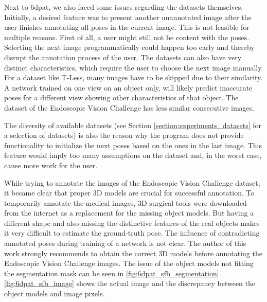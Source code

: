 Next to \ac{6dpat}, we also faced some issues regarding the datasets themselves. Initially, a desired feature was to present another unannotated image after the user finishes annotating all poses in the current image. This is not feasible for multiple reasons. First of all, a user might still not be content with the poses. Selecting the next image programmatically could happen too early and thereby disrupt the annotation process of the user. The datasets can also have very distinct characteristics, which require the user to choose the next image manually. For a dataset like T-Less, many images have to be skipped due to their similarity. A network trained on one view on an object only, will likely predict inaccurate poses for a different view showing other characteristics of that object. The dataset of the Endoscopic Vision Challenge has less similar consecutive images.

The diversity of available datasets (see Section \ref{section:experiments_datasets} for a selection of datasets) is also the reason why the program does not provide functionality to initialize the next poses based on the ones in the last image. This feature would imply too many assumptions on the dataset and, in the worst case, cause more work for the user. 

While trying to annotate the images of the Endoscopic Vision Challenge dataset, it became clear that proper 3D models are crucial for successful annotation. To temporarily annotate the medical images, 3D surgical tools were downloaded from the internet as a replacement for the missing object models. But having a different shape and also missing the distinctive features of the real objects makes it very difficult to estimate the ground-truth pose. The influence of contradicting annotated poses during training of a network is not clear. The author of this work strongly recommends to obtain the correct 3D models before annotating the Endoscopic Vision Challenge images. The issue of the object models not fitting the segmentation mask can be seen in \fig \ref{fig:6dpat_sfb_segmentation}. \fig \ref{fig:6dpat_sfb_image} shows the actual image and the discrepancy between the object models and image pixels.

